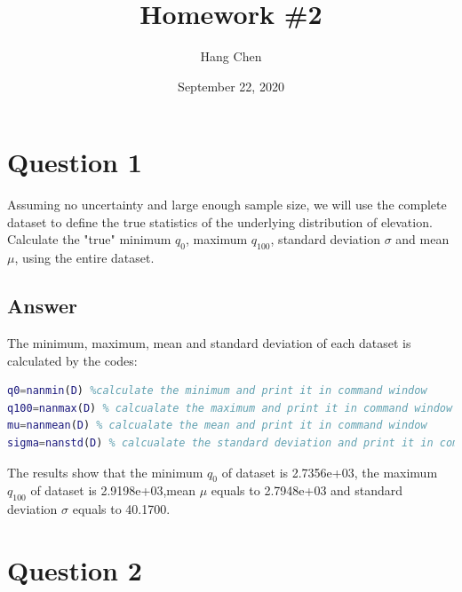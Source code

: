 \documentclass[
	12pt, %
]{fphw}
\title{Homework \#2} %
\author{Hang Chen} %
\date{September 22, 2020}
\institute{Boise State University \\ Department of geoscience} %
\begin{document}
\maketitle %


\section*{Question 1}

\begin{problem}
	Assuming no uncertainty and large enough sample size, we will use the complete dataset to define the true statistics of the underlying distribution of elevation. Calculate the "true" 	minimum $q_0$, maximum $q_{100}$, standard deviation $\sigma$ and mean $\mu$, using the entire dataset.
\end{problem}





\subsection*{Answer}

The minimum, maximum, mean and standard deviation of each dataset is calculated by the codes:
\begin{lstlisting}[language=Matlab,escapeinside=``]
q0=nanmin(D) %calculate the minimum and print it in command window
q100=nanmax(D) % calcualate the maximum and print it in command window
mu=nanmean(D) % calcualate the mean and print it in command window
sigma=nanstd(D) % calcualate the standard deviation and print it in command window
\end{lstlisting}

The results show that the 	minimum $q_0$ of dataset is  2.7356e+03, the  maximum $q_{100}$ of dataset is   2.9198e+03,mean $\mu$ equals to 2.7948e+03 and standard deviation $\sigma$ equals to  40.1700.





\section*{Question 2}
\end{document}
